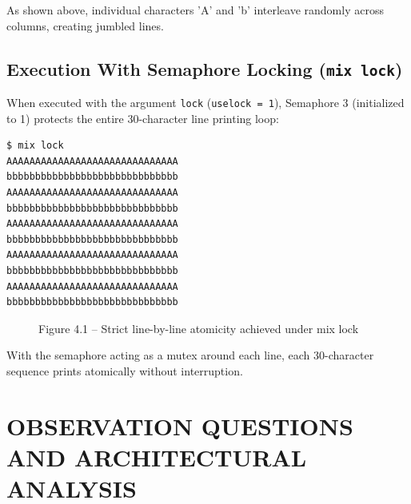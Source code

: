 \documentclass[12pt,a4paper]{report}
\numberwithin{equation}{chapter}
\numberwithin{figure}{chapter}
\numberwithin{table}{chapter}
\begin{document}
As shown above, individual characters 'A' and 'b' interleave randomly across columns, creating jumbled lines.

\section{Execution With Semaphore Locking (\texttt{mix lock})}
When executed with the argument \texttt{lock} (\texttt{uselock = 1}), Semaphore 3 (initialized to 1) protects the entire 30-character line printing loop:

\begin{lstlisting}[language=bash]
$ mix lock
AAAAAAAAAAAAAAAAAAAAAAAAAAAAAA
bbbbbbbbbbbbbbbbbbbbbbbbbbbbbb
AAAAAAAAAAAAAAAAAAAAAAAAAAAAAA
bbbbbbbbbbbbbbbbbbbbbbbbbbbbbb
AAAAAAAAAAAAAAAAAAAAAAAAAAAAAA
bbbbbbbbbbbbbbbbbbbbbbbbbbbbbb
AAAAAAAAAAAAAAAAAAAAAAAAAAAAAA
bbbbbbbbbbbbbbbbbbbbbbbbbbbbbb
AAAAAAAAAAAAAAAAAAAAAAAAAAAAAA
bbbbbbbbbbbbbbbbbbbbbbbbbbbbbb
\end{lstlisting}

\begin{figure}[H]
\centering
\caption{Figure 4.1 -- Strict line-by-line atomicity achieved under mix lock}
\end{figure}

With the semaphore acting as a mutex around each line, each 30-character sequence prints atomically without interruption.

\chapter{OBSERVATION QUESTIONS AND ARCHITECTURAL ANALYSIS}
\end{document}
